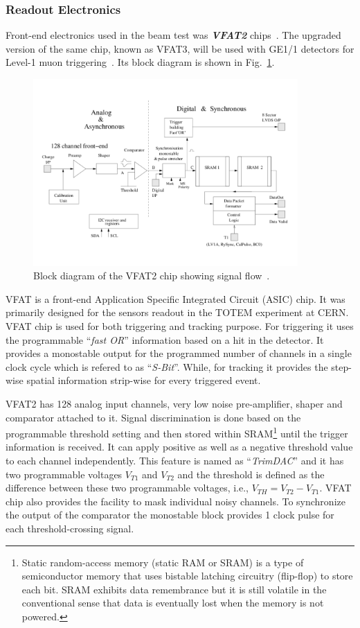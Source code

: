 \subsubsection{Readout Electronics} %
\label{ssub:readout_electronics}
Front-end electronics used in the beam test was \textbf{\textit{VFAT2}} chips~\cite{Aspell2007,Berardi2004}.
The upgraded version of the same chip, known as VFAT3, will be used with GE1/1 detectors for Level-1 muon triggering~\cite{Licciulli2017}. Its block diagram is shown in Fig.~\ref{fig:VFAT2block}.
\begin{figure}[!htbp]
    \centering
    \includegraphics[width=0.9\textwidth]{figures/GEM/VFAT2_chip_BlockDiagram.pdf}
    \caption{Block diagram of the VFAT2 chip showing signal flow~\cite{Aspell2007}.}
    \label{fig:VFAT2block}
\end{figure}
VFAT is a front-end Application Specific Integrated Circuit (ASIC) chip. It was primarily designed for the sensors readout in the TOTEM experiment at CERN. 
VFAT chip is used for both triggering and tracking purpose.
For triggering it uses the programmable ``\textit{fast OR}'' information based on a hit in the detector.
It provides a monostable output for the programmed number of channels in a single clock cycle which is refered to as 
 ``\textit{S-Bit}''. While, for tracking it provides the  step-wise spatial information strip-wise for every triggered event.

VFAT2 has 128 analog input channels, very low noise pre-amplifier, shaper and comparator attached to it. 
Signal discrimination is done based on the programmable threshold setting and then stored within SRAM\footnote{Static random-access memory (static RAM or SRAM) is a type of semiconductor memory that uses bistable latching circuitry (flip-flop) to store each bit. SRAM exhibits data remembrance but it is still volatile in the conventional sense that data is eventually lost when the memory is not powered.} until the trigger information is received. 
It can apply positive as well as a negative threshold value to each channel independently. 
This feature is named as ``\textit{TrimDAC}'' and it has two programmable voltages $V_{T1}$ and $V_{T2}$ and the threshold is defined as the difference between these two programmable voltages, i.e., $V_{TH} = V_{T2} - V_{T1}$.
VFAT chip also provides the facility to mask individual noisy channels.
To synchronize the output of the comparator the monostable block provides 1 clock pulse for each threshold-crossing signal.

